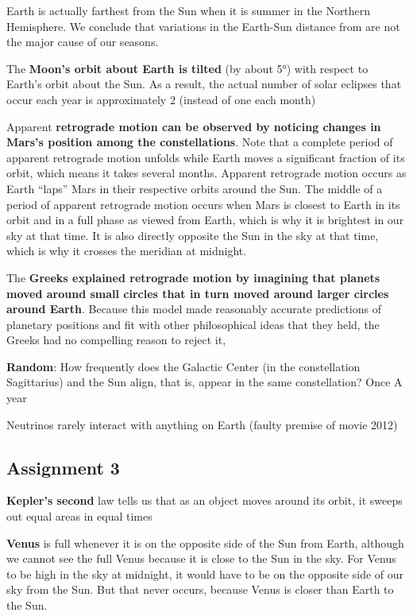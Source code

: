 \documentclass[12pt]{article}
\begin{document}
Earth is actually farthest from the Sun when it is summer in the Northern Hemisphere. We conclude that variations in the Earth-Sun distance from are not the major cause of our seasons.

The {\bf Moon’s orbit about Earth is tilted} (by about 5°) with respect to Earth’s orbit about the Sun. As a result, the actual number of solar eclipses that occur each year is approximately 2 (instead of one each month)

Apparent {\bf retrograde motion can be observed by noticing changes in Mars's position among the constellations}. Note that a complete period of apparent retrograde motion unfolds while Earth moves a significant fraction of its orbit, which means it takes several months. Apparent retrograde motion occurs as Earth ``laps'' Mars in their respective orbits around the Sun. The middle of a period of apparent retrograde motion occurs when Mars is closest to Earth in its orbit and in a full phase as viewed from Earth, which is why it is brightest in our sky at that time. It is also directly opposite the Sun in the sky at that time, which is why it crosses the meridian at midnight.

The {\bf Greeks explained retrograde motion by imagining that planets moved around small circles that in turn moved around larger circles around Earth}. Because this model made reasonably accurate predictions of planetary positions and fit with other philosophical ideas that they held, the Greeks had no compelling reason to reject it,

{\bf Random}: How frequently does the Galactic Center (in the constellation Sagittarius) and the Sun align, that is, appear in the same constellation? Once A year

Neutrinos rarely interact with anything on Earth (faulty premise of movie 2012)

\subsection{Assignment 3}
{\bf Kepler's second} law tells us that as an object moves around its orbit, it sweeps out equal areas in equal times

{\bf Venus} is full whenever it is on the opposite side of the Sun from Earth, although we cannot see the full Venus because it is close to the Sun in the sky. For Venus to be high in the sky at midnight, it would have to be on the opposite side of our sky from the Sun. But that never occurs, because Venus is closer than Earth to the Sun.
\end{document}
